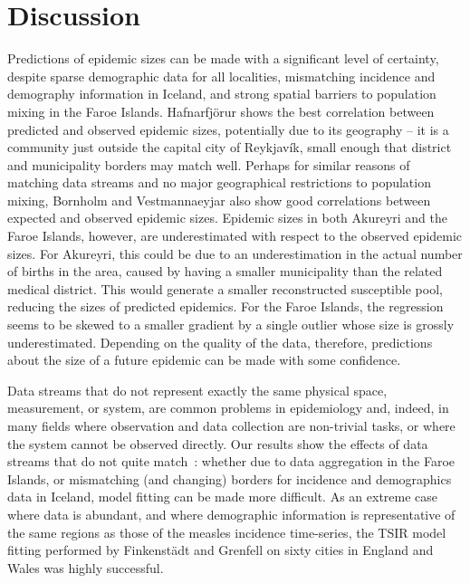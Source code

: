 \documentclass[10pt]{article}
\begin{document}
\section*{Discussion}

Predictions of epidemic sizes can be made with a significant level of certainty, despite sparse demographic data for all localities, mismatching incidence and demography information in Iceland, and strong spatial barriers to population mixing in the Faroe Islands. Hafnarfj\"{o}r\dh{}ur shows the best correlation between predicted and observed epidemic sizes, potentially due to its geography -- it is a community just outside the capital city of Reykjav\'{i}k, small enough that district and municipality borders may match well. Perhaps for similar reasons of matching data streams and no major geographical restrictions to population mixing, Bornholm and Vestmannaeyjar also show good correlations between expected and observed epidemic sizes. Epidemic sizes in both Akureyri and the Faroe Islands, however, are underestimated with respect to the observed epidemic sizes. For Akureyri, this could be due to an underestimation in the actual number of births in the area, caused by having a smaller municipality than the related medical district. This would generate a smaller reconstructed susceptible pool, reducing the sizes of predicted epidemics. For the Faroe Islands, the regression seems to be skewed to a smaller gradient by a single outlier whose size is grossly underestimated. Depending on the quality of the data, therefore, predictions about the size of a future epidemic can be made with some confidence. 

Data streams that do not represent exactly the same physical space, measurement, or system, are common problems in epidemiology and, indeed, in many fields where observation and data collection are non-trivial tasks, or where the system cannot be observed directly. Our results show the effects of data streams that do not quite match~: whether due to data aggregation in the Faroe Islands, or mismatching (and changing) borders for incidence and demographics data in Iceland, model fitting can be made more difficult. As an extreme case where data is abundant, and where demographic information is representative of the same regions as those of the measles incidence time-series, the TSIR model fitting performed by Finkenst\"{a}dt and Grenfell \cite{Finkenstadt2000} on sixty cities in England and Wales was highly successful.
\end{document}

